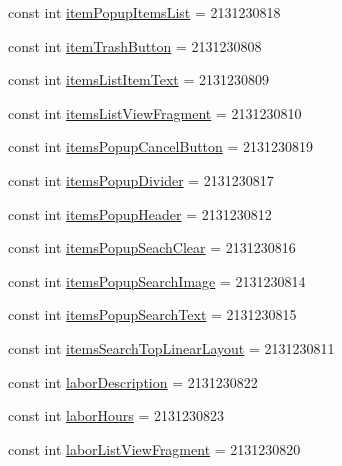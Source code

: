 \begin{DoxyCompactItemize}
\item 
const int \hyperlink{class_field_service_1_1_android_1_1_resource_1_1_id_aa6c2181886b753619d0b1854ac81ff5e}{item\+Popup\+Items\+List} = 2131230818
\item 
const int \hyperlink{class_field_service_1_1_android_1_1_resource_1_1_id_a3d4a33245dbaa169a93f5e9c2213cdd1}{item\+Trash\+Button} = 2131230808
\item 
const int \hyperlink{class_field_service_1_1_android_1_1_resource_1_1_id_a24733042e3adb62f86ad54bdaf6d33cc}{items\+List\+Item\+Text} = 2131230809
\item 
const int \hyperlink{class_field_service_1_1_android_1_1_resource_1_1_id_abb9ab6b6cf8de506459d56e78f2e44f3}{items\+List\+View\+Fragment} = 2131230810
\item 
const int \hyperlink{class_field_service_1_1_android_1_1_resource_1_1_id_ac173221b5bc8b2a17d410df602e932c9}{items\+Popup\+Cancel\+Button} = 2131230819
\item 
const int \hyperlink{class_field_service_1_1_android_1_1_resource_1_1_id_a047a928b1f75dcdcee7909ca2d9084b2}{items\+Popup\+Divider} = 2131230817
\item 
const int \hyperlink{class_field_service_1_1_android_1_1_resource_1_1_id_a33c1f557639912259d51a36401ad3e7f}{items\+Popup\+Header} = 2131230812
\item 
const int \hyperlink{class_field_service_1_1_android_1_1_resource_1_1_id_a711b835136f83d033311b4a11c11977e}{items\+Popup\+Seach\+Clear} = 2131230816
\item 
const int \hyperlink{class_field_service_1_1_android_1_1_resource_1_1_id_a4a3aefa7e52b46b9d79ea85070e1eb00}{items\+Popup\+Search\+Image} = 2131230814
\item 
const int \hyperlink{class_field_service_1_1_android_1_1_resource_1_1_id_a043c5213e59d045d3c8b060aaa603868}{items\+Popup\+Search\+Text} = 2131230815
\item 
const int \hyperlink{class_field_service_1_1_android_1_1_resource_1_1_id_afd3c832408e7ae1fa803ebc75aab3643}{items\+Search\+Top\+Linear\+Layout} = 2131230811
\item 
const int \hyperlink{class_field_service_1_1_android_1_1_resource_1_1_id_a333c8ba2177876af85047efece314326}{labor\+Description} = 2131230822
\item 
const int \hyperlink{class_field_service_1_1_android_1_1_resource_1_1_id_a3cd3fa3978e8ed3d3c1b6ac57db62a9b}{labor\+Hours} = 2131230823
\item 
const int \hyperlink{class_field_service_1_1_android_1_1_resource_1_1_id_a4d23da098ad34397486f522e124276b7}{labor\+List\+View\+Fragment} = 2131230820

\end{DoxyCompactItemize}
